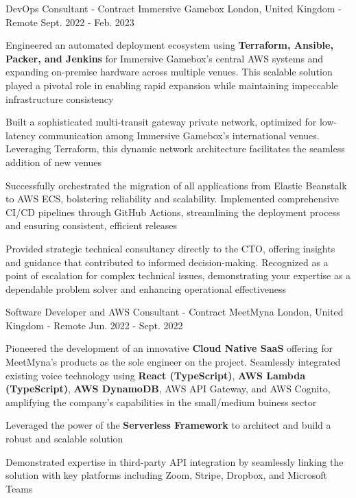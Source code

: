 \begin{cventries}
  \cventry
    {DevOps Consultant - Contract} %
    {Immersive Gamebox} %
    {London, United Kingdom - Remote} %
    {Sept. 2022 - Feb. 2023} %
    {
      \begin{cvitems} %
        \item {Engineered an automated deployment ecosystem using \textbf{Terraform, Ansible, Packer, and Jenkins} for Immersive Gamebox's central AWS systems and expanding on-premise hardware across multiple venues. This scalable solution played a pivotal role in enabling rapid expansion while maintaining impeccable infrastructure consistency}
        \item {Built a sophisticated multi-transit gateway private network, optimized for low-latency communication among Immersive Gamebox's international venues. Leveraging Terraform, this dynamic network architecture facilitates the seamless addition of new venues}
        \item {Successfully orchestrated the migration of all applications from Elastic Beanstalk to AWS ECS, bolstering reliability and scalability. Implemented comprehensive CI/CD pipelines through GitHub Actions, streamlining the deployment process and ensuring consistent, efficient releases}
        \item {Provided strategic technical consultancy directly to the CTO, offering insights and guidance that contributed to informed decision-making. Recognized as a point of escalation for complex technical issues, demonstrating your expertise as a dependable problem solver and enhancing operational effectiveness}
      \end{cvitems}
    }

  \cventry
    {Software Developer and AWS Consultant - Contract} %
    {MeetMyna} %
    {London, United Kingdom - Remote} %
    {Jun. 2022 - Sept. 2022} %
    {
      \begin{cvitems} %
        \item {Pioneered the development of an innovative \textbf{Cloud Native SaaS} offering for MeetMyna's products as the sole engineer on the project. Seamlessly integrated existing voice technology using \textbf{React (TypeScript)}, \textbf{AWS Lambda (TypeScript)}, \textbf{AWS DynamoDB}, AWS API Gateway, and AWS Cognito, amplifying the company's capabilities in the small/medium buiness sector}
        \item {Leveraged the power of the \textbf{Serverless Framework} to architect and build a robust and scalable solution}
        \item {Demonstrated expertise in third-party API integration by seamlessly linking the solution with key platforms including Zoom, Stripe, Dropbox, and Microsoft Teams}
      \end{cvitems}
    }


\end{cventries}
